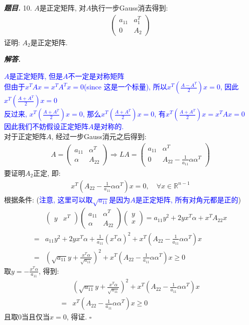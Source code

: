 \documentclass[10pt, a4paper, oneside]{ctexart}
\newenvironment{problem}{\begin{framed}\par\noindent\textbf{\textit{题目. }}}{\end{framed}\par}
\newenvironment{solution}{%
  \par\noindent\textbf{\textit{解答. }}\ignorespaces
}{%
  \hfill\ensuremath{\square}\par %
}
\begin{document}
\begin{problem}
10. $A$是正定矩阵, 对$A$执行一步Gauss消去得到:
\begin{align*}
    \begin{pmatrix}
        a_{11}& a_1^T \\ 0 &A_2
    \end{pmatrix}
\end{align*}
证明: $A_2$是正定矩阵.
\end{problem}
\begin{solution}
\textcolor{blue}{$A$是正定矩阵, 但是$A$不一定是对称矩阵\\但由于$x^TAx = x^TA^Tx=0$(since 这是一个标量), 所以$x^T(\frac{A-A^T}{2})x=0$, 因此$x^T(\frac{A+A^T}{2})x=0$\\ 反过来, $x^T(\frac{A+A^T}{2})x=0$, 那么$x^T(\frac{A+A^T}{2})x=0$, 有$x^T(\frac{A+A^T}{2})x=x^TAx=0$\\ 因此我们不妨假设正定矩阵$A$是对称的.}\\
对于正定矩阵$A$, 经过一步Gauss消元之后得到:
\begin{align*}
    A=\begin{pmatrix}
        a_{11} & \alpha^T \\ \alpha & A_{22} 
    \end{pmatrix} \Rightarrow LA = \begin{pmatrix}
        a_{11}&\alpha^T \\ 0 & A_{22} - \frac{1}{a_{11}}\alpha \alpha^T
    \end{pmatrix}
\end{align*}
要证明$A_2$正定, 即:
\begin{align*}
    x^T(A_{22} - \frac{1}{a_{11}}\alpha \alpha^T)x=0,\quad \forall x\in \mathbb{R}^{n-1}
\end{align*}     
根据条件: (\textcolor{blue}{注意, 这里可以取$\sqrt{a_{11}}$是因为$A$是正定矩阵, 所有对角元都是正的})
\begin{align*}
    &\begin{pmatrix}
        y&x^T
    \end{pmatrix} \begin{pmatrix}
        a_{11} & \alpha^T \\ \alpha & A_{22} 
    \end{pmatrix} \begin{pmatrix}
        y\\x
    \end{pmatrix}=a_{11}y^2+ 2yx^T\alpha +x^TA_{22}x\\
    =& a_{11}y^2+ 2yx^T\alpha + \frac{1}{a_{11}}(x^T\alpha )^2 +x^T(A_{22} - \frac{1}{a_{11}}\alpha \alpha^T)x\\
    =& (\sqrt{a_{11}}y + \frac{x^T\alpha}{\sqrt{a_{11}}})^2 + x^T(A_{22} - \frac{1}{a_{11}}\alpha \alpha^T)x \geq 0
\end{align*}
取$y = - \frac{x^T\alpha}{a_{11}}$, 得到:
\begin{align*}
    &(\sqrt{a_{11}}y + \frac{x^T\alpha}{\sqrt{a_{11}}})^2 + x^T(A_{22} - \frac{1}{a_{11}}\alpha \alpha^T)x\\
    =&x^T(A_{22} - \frac{1}{a_{11}}\alpha \alpha^T)x\geq 0
\end{align*}
且取$0$当且仅当$x=0$, 得证.
\end{solution}
\end{document}

